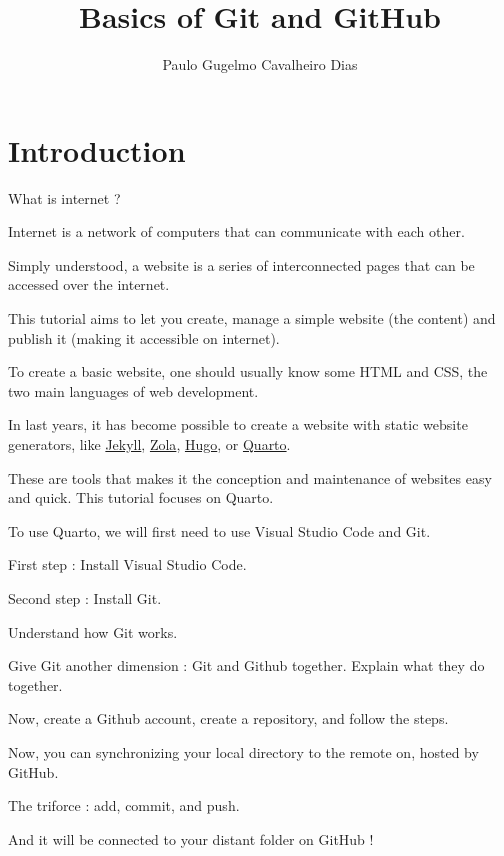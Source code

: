 \documentclass{beamer}
\title{Basics of Git and GitHub}
\author{Paulo Gugelmo Cavalheiro Dias}
\begin{document}
\section{Introduction}

\begin{frame}
    What is internet ? 

    Internet is a network of computers that can communicate with each other.

    Simply understood, a website is a series of interconnected pages that can be accessed over the internet.

    This tutorial aims to let you create, manage a simple website (the content) and publish it (making it accessible on internet). 
\end{frame}

\begin{frame}
    To create a basic website, one should usually know some HTML and CSS, the two main languages of web development.

    In last years, it has become possible to create a website with static website generators, like \hyperlink{https://jekyllrb.com}{Jekyll}, \hyperlink{https://www.getzola.org/}{Zola}, \hyperlink{https://www.gohugo.io/}{Hugo}, or \hyperlink{http://quarto.org}{Quarto}.

    These are tools that makes it the conception and maintenance of websites easy and quick. This tutorial focuses on Quarto.

    To use Quarto, we will first need to use Visual Studio Code and Git.
\end{frame}

\begin{frame}
    First step : Install Visual Studio Code.
\end{frame}

\begin{frame}
    Second step : Install Git.
\end{frame}

\begin{frame}
    Understand how Git works.
\end{frame}

\begin{frame}
    Give Git another dimension : Git and Github together. Explain what they do together. 
\end{frame}

\begin{frame}
    Now, create a Github account, create a repository, and follow the steps. 
\end{frame}

\begin{frame}
    Now, you can synchronizing your local directory to the remote on, hosted by GitHub.
\end{frame}

\begin{frame}
    The triforce : add, commit, and push.
\end{frame}

\begin{frame}
    And it will be connected to your distant folder on GitHub ! 
\end{frame}
\end{document}
